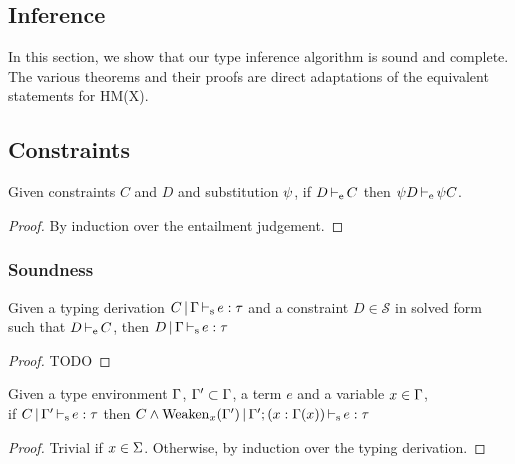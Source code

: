 \subsection{Inference}

In this section, we show that our type inference algorithm is sound and complete.
The various theorems and their proofs are direct adaptations
of the equivalent statements for HM(X).

\subsection{Constraints}


\begin{lemma}
  \label{lemma:constrsubst}
  Given constraints $C$ and $D$ and substitution $\mathrm{\psi}$, if $D \operatorname{\vdash_e} C$
  then $\mathrm{\psi} D \operatorname{\vdash_e} \mathrm{\psi} C$.
  \begin{proof}
    By induction over the entailment judgement.
  \end{proof}
\end{lemma}

\subsubsection{Soundness}

\begin{lemma}
  \label{lemma:constrimply}
  Given a typing derivation $C \operatorname{|} \Gamma \operatorname{\vdash_s} e : \tau$ and
  a constraint $D \in \mathcal S$ in solved form such that $D \operatorname{\vdash_e} C$, then
  $D \operatorname{|} \Gamma \operatorname{\vdash_s} e : \tau$
  \begin{proof}
    TODO
  \end{proof}
\end{lemma}


\begin{lemma}
  \label{lemma:typ:weakening}
  Given a type environment $\Gamma$, $\Gamma' \subset \Gamma$, a term $e$ and a variable $x\in\Gamma$,\\
  if $C \operatorname{|} \Gamma' \operatorname{\vdash_s} e : \tau$
  then $C\wedge \operatorname{Weaken}_{x}(\Gamma') \operatorname{|} \Gamma';(x : \Gamma(x)) \operatorname{\vdash_s} e : \tau$

  \begin{proof}
    Trivial if $x \in \Sigma$. Otherwise, by induction over the typing derivation.
  \end{proof}
\end{lemma}


